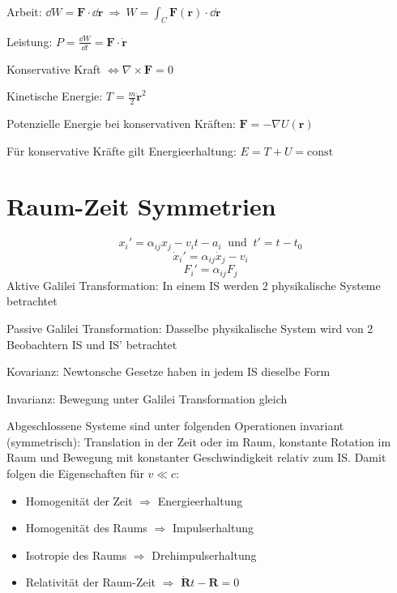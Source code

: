 \begin{framedthm}[Energieerhaltung]
	Arbeit: $\dd W = \mathbf{F} \cdot \dd \mathbf{r} \ \Rightarrow \ W = \int_C \mathbf{F(r)} \cdot \dd \mathbf{r}$
	
	Leistung: $ P = \frac{\dd W}{ \dd t} = \mathbf{F} \cdot \mathbf{\dot r}$
	
	Konservative Kraft $ \iff \nabla \times \mathbf{F} = 0$
	
	Kinetische Energie: $T = \frac{m}{2} \mathbf{\dot r}^2$
	
	Potenzielle Energie bei konservativen Kräften: $\mathbf{F} = - \nabla U(\mathbf{r})$
	
	Für konservative Kräfte gilt Energieerhaltung: $E = T + U = \textrm{const}$
\end{framedthm}


\section{Raum-Zeit Symmetrien}

\begin{framedprop}
	\[ x_i' = \alpha_{ij} x_j - v_i t - a_i \ \textrm{ und } \ t' = t - t_0 \]
	\[ \dot x_i' = \alpha_{ij} \dot x_j - v_i \]
	\[ F_i' = \alpha_{ij} F_j \]
	Aktive Galilei Transformation: In einem IS werden 2 physikalische Systeme betrachtet
	
	Passive Galilei Transformation: Dasselbe physikalische System wird von 2 Beobachtern IS und IS' betrachtet
	
	Kovarianz: Newtonsche Gesetze haben in jedem IS dieselbe Form
	
	Invarianz: Bewegung unter Galilei Transformation gleich
\end{framedprop}

\begin{framedthm}
	Abgeschlossene Systeme sind unter folgenden Operationen invariant (symmetrisch): Translation in der Zeit oder im Raum, konstante Rotation im Raum und Bewegung mit konstanter Geschwindigkeit relativ zum IS. Damit folgen die Eigenschaften für $v \ll c$:
	
	\begin{itemize}
		\item Homogenität der Zeit $\Rightarrow$ Energieerhaltung
		\item Homogenität des Raums $\Rightarrow$ Impulserhaltung
		\item Isotropie des Raums $\Rightarrow$ Drehimpulserhaltung
		\item Relativität der Raum-Zeit $\Rightarrow$ $\mathbf{\dot R} t - \mathbf{R} = 0$
	\end{itemize}
\end{framedthm}


